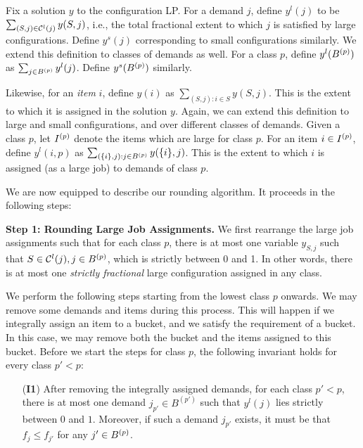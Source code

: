 Fix a solution $y$ to the configuration LP. For a demand $j$, define $y^l(j)$ to be $\sum_{(S,j) \in {\cal C}^l(j)} y(S,j)$, i.e., the total fractional extent to which $j$ is satisfied by large configurations. Define $y^s(j)$ corresponding to small configurations similarly. We extend this definition to classes of demands as well. For a class $p$, define $y^l(B^{(p)})$ as $\sum_{j \in B^{(p)}} y^l(j)$. Define $y^s(B^{(p)})$ similarly.

Likewise, for an \emph{item} $i$, define $y(i)$ as $\sum_{(S,j): i \in S} y(S,j)$. This is the extent to which it is assigned in the solution $y$. Again, we can extend this definition to large and small configurations, and over different classes of demands. Given a class $p$, let $I^{(p)}$ denote the items which are large for class $p$. For an item $i \in I^{(p)}$, define $y^l(i,p)$ as $\sum_{(\{i\}, j): j \in B^{(p)}} y(\{i\}, j)$. This is the extent to which $i$ is assigned (as a large job) to demands of class $p$.

\medskip \noindent We are now equipped to describe our rounding algorithm. It proceeds in the following steps:



\medskip \noindent
{\bf Step 1: Rounding Large Job Assignments.} We first rearrange the large job assignments such that for each class $p$, there is at most one variable $y_{S,j}$ such that $S \in {\cal C}^l(j), j \in B^{(p)}$, which is strictly between 0 and 1. In other words, there is at most one \emph{strictly fractional} large configuration assigned in any class.

We perform the following steps starting from the lowest class $p$ onwards.
We may remove some demands and items during this process. This will happen if we integrally assign an item to a bucket, and we satisfy the requirement of a bucket. In this case, we may remove both the bucket and the items assigned to this bucket. Before we start the steps for class $p$, the following invariant holds for every class $p' < p$:

\begin{itemize}
\item[({\bf I1})] After removing the integrally assigned demands, for each class $p' < p$, there is at most one  demand $j_{p'} \in B^{(p')}$ such that $y^l(j)$ lies strictly between $0$ and $1$.  Moreover, if such a demand $j_{p'}$ exists, it must be that $f_j \leq f_{j'}$ for any $j' \in B^{(p)}$.
\end{itemize}

